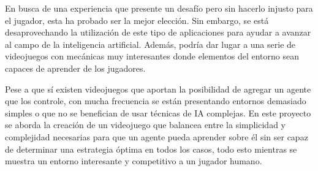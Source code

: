 \bigskip

En busca de una experiencia que presente un desafío pero sin hacerlo injusto para el jugador, esta ha probado ser la mejor elección. Sin embargo, se está desaprovechando la utilización de este tipo de aplicaciones para ayudar a avanzar al campo de la inteligencia artificial. Además, podría dar lugar a una serie de videojuegos con mecánicas muy interesantes donde elementos del entorno sean capaces de aprender de los jugadores.

\bigskip

Pese a que sí existen videojuegos que aportan la posibilidad de agregar un agente que los controle, con mucha frecuencia se están presentando entornos demasiado simples o que no se benefician de usar técnicas de IA complejas. En este proyecto se aborda la creación de un videojuego que balancea entre la simplicidad y complejidad necesarias para que un agente pueda aprender sobre él sin ser capaz de determinar una estrategia óptima en todos los casos, todo esto mientras se muestra un entorno interesante y competitivo a un jugador humano.


